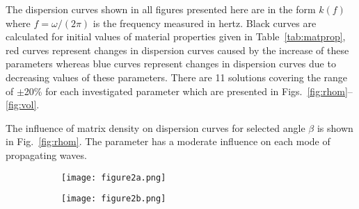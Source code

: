 \documentclass[preprint,12pt]{elsarticle}
\providecommand{\DIFaddbeginFL}{} %
\providecommand{\DIFaddendFL}{} %
\providecommand{\DIFdelbeginFL}{} %
\providecommand{\DIFdelendFL}{} %
\begin{document}
 The dispersion curves shown in all figures presented here are in the form $k(f)$ where $f=\omega/(2 \pi)$ is the frequency measured in hertz. Black curves are calculated for initial values of material properties given in Table~\ref{tab:matprop}, red curves represent changes in dispersion curves caused by the increase of these parameters whereas blue curves represent changes in dispersion curves due to decreasing values of these parameters. There are 11 solutions covering the range of $\pm$20\% for each investigated parameter which are presented in Figs.~\ref{fig:rhom}--\ref{fig:vol}.

 The influence of matrix density on dispersion curves for selected angle $\beta$ is shown in Fig.~\ref{fig:rhom}. The parameter has a moderate influence on each mode of propagating waves.

 \begin{figure} [h!]
 	\DIFdelbeginFL %
\DIFdelendFL \centering
 	\begin{subfigure}[b]{0.49\textwidth}
 		\centering
 		\DIFdelbeginFL %
\DIFdelendFL \DIFaddbeginFL \texttt{[image: figure2a.png]}
 		\DIFaddendFL \caption{}
 		\label{fig:rhom0}
 	\end{subfigure}
 	\hfill
 	\begin{subfigure}[b]{0.49\textwidth}
 		\centering
 		\DIFdelbeginFL %
\DIFdelendFL \DIFaddbeginFL \texttt{[image: figure2b.png]}
 		\DIFaddendFL \caption{}
 		\label{fig:rhom30}
 	\end{subfigure}

\end{figure}
\end{document}
